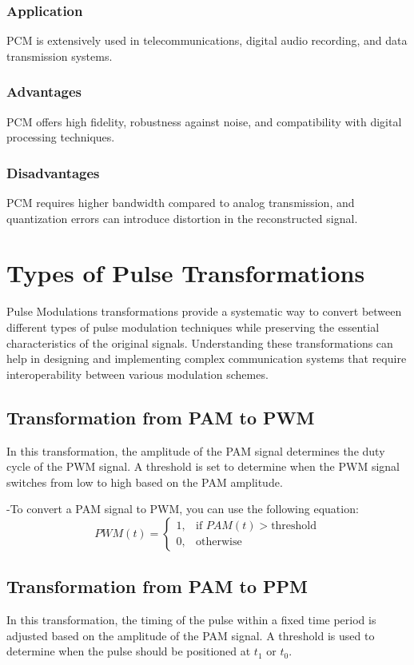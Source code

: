 \documentclass{IEEEtran}
\begin{document}
	\subsubsection{Application}
	PCM is extensively used in telecommunications, digital audio recording, and data transmission systems.
	
	\subsubsection{Advantages}
	PCM offers high fidelity, robustness against noise, and compatibility with digital processing techniques.
	
	\subsubsection{Disadvantages}
	PCM requires higher bandwidth compared to analog transmission, and quantization errors can introduce distortion in the reconstructed signal.
	
	
	\section{Types of Pulse Transformations}
		Pulse Modulations transformations provide a systematic way to convert between different types of pulse modulation techniques while preserving the essential characteristics of the original signals. Understanding these transformations can help in designing and implementing complex communication systems that require interoperability between various modulation schemes.
	\subsection{Transformation from PAM to PWM}	
	 In this transformation, the amplitude of the PAM signal determines the duty cycle of the PWM signal. A threshold is set to determine when the PWM signal switches from low to high based on the PAM amplitude.
	 
	 -To convert a PAM signal to PWM, you can use the following equation:
	 \begin{equation}
	 {PWM}(t) = 
	 \begin{cases}
	 	1, & \text{if } {PAM}(t) > \text{threshold} \\
	 	0, & \text{otherwise}
	 \end{cases}
	 \end{equation}
	\subsection{Transformation from PAM to PPM}
	In this transformation, the timing of the pulse within a fixed time period is adjusted based on the amplitude of the PAM signal. A threshold is used to determine when the pulse should be positioned at $t_1$ or $t_0$.
	
\end{document}
